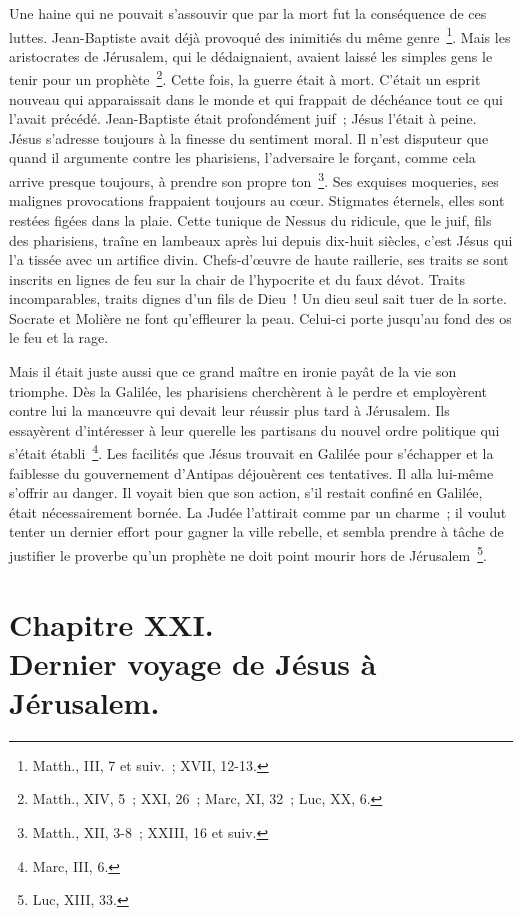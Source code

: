 \documentclass[french,twoside]{book} %
\newcommand\chapteropen{} %
\newcommand\chapterclose{} %
\begin{document}
Une haine qui ne pouvait s’assouvir que par la mort fut la conséquence de ces luttes. Jean-Baptiste avait déjà provoqué des inimitiés du même genre \footnote{Matth., III, 7 et suiv. ; XVII, 12-13.}. Mais les aristocrates de Jérusalem, qui le dédaignaient, avaient laissé les simples gens le tenir pour un prophète \footnote{Matth., XIV, 5 ; XXI, 26 ; Marc, XI, 32 ; Luc, XX, 6.}. Cette fois, la guerre était à mort. C’était un esprit nouveau qui apparaissait dans le monde et qui frappait de déchéance tout ce qui l’avait précédé. Jean-Baptiste était profondément juif ; Jésus l’était à peine. Jésus s’adresse toujours à la finesse du sentiment moral. Il n’est disputeur que quand il argumente contre les pharisiens, l’adversaire le forçant, comme cela arrive presque toujours, à prendre son propre ton \footnote{Matth., XII, 3-8 ; XXIII, 16 et suiv.}. Ses exquises moqueries, ses malignes provocations frappaient toujours au cœur. Stigmates éternels, elles sont restées figées dans la plaie. Cette tunique de Nessus du ridicule, que le juif, fils des pharisiens, traîne en lambeaux après lui depuis dix-huit siècles, c’est Jésus qui l’a tissée avec un artifice divin. Chefs-d’œuvre de haute raillerie, ses traits se sont inscrits en lignes de feu sur la chair de l’hypocrite et du faux dévot. Traits incomparables, traits dignes d’un fils de Dieu ! Un dieu seul sait tuer de la sorte. Socrate et Molière ne font qu’effleurer la peau. Celui-ci porte jusqu’au fond des os le feu et la rage.\par
Mais il était juste aussi que ce grand maître en ironie payât de la vie son triomphe. Dès la Galilée, les pharisiens cherchèrent à le perdre et employèrent contre lui la manœuvre qui devait leur réussir plus tard à Jérusalem. Ils essayèrent d’intéresser à leur querelle les partisans du nouvel ordre politique qui s’était établi \footnote{Marc, III, 6.}. Les facilités que Jésus trouvait en Galilée pour s’échapper et la faiblesse du gouvernement d’Antipas déjouèrent ces tentatives. Il alla lui-même s’offrir au danger. Il voyait bien que son action, s’il restait confiné en Galilée, était nécessairement bornée. La Judée l’attirait comme par un charme ; il voulut tenter un dernier effort pour gagner la ville rebelle, et sembla prendre à tâche de justifier le proverbe qu’un prophète ne doit point mourir hors de Jérusalem \footnote{Luc, XIII, 33.}.
\chapterclose


\chapteropen
\chapter[{Chapitre XXI. Dernier voyage de Jésus à Jérusalem.}]{Chapitre XXI.\\
Dernier voyage de Jésus à Jérusalem.}\renewcommand{\leftmark}{Chapitre XXI.\\
Dernier voyage de Jésus à Jérusalem.}
\end{document}
